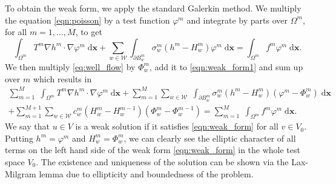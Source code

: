 \documentclass{elsarticle}
\def\vc#1{\mathbf{\boldsymbol{#1}}}     %
\def\avg#1{\langle#1\rangle}
\newcommand{\dd}{\; \mathrm{d}}
\newcommand{\bx}{\vc{x}}
\newcommand{\noteJB}[1]{{\color{Blue} \textbf{JB: } \textit{#1}}}
\begin{document}
To obtain the weak form, we apply the standard Galerkin method. We multiply the equation \eqref{eqn:poisson} 
by a test function $\varphi^m$ and integrate by parts over $\Omega^m$, for all $m=1,\ldots,M$, to get
\begin{equation} \label{eqn:weak_form1}
  \int_{\Omega^m} T^m \nabla h^m \cdot \nabla \varphi^m \dd\bx
  + \sum_{w\in \mathcal{W}} \int_{\partial B^m_w} \sigma^m_w (h^m - H_w^m) \varphi^m \dd\bx
  = \int_{\Omega^m} f^m\varphi^m \dd\bx.
\end{equation}
We then multiply \eqref{eq:well_flow} by $\Phi^m_w$, add it to \eqref{eqn:weak_form1} 
and sum up over $m$ which results in
\begin{multline} \label{eqn:weak_form}
  \sum_{m=1}^M \; \int_{\Omega^m} T^m \nabla h^m \cdot \nabla \varphi^m \dd\bx
        + \sum_{m=1}^M \sum_{w\in \mathcal{W}} \; 
           \int_{\partial B^m_w} \sigma^m_w\left(h^m-H^m_w\right)\left(\varphi^m-\Phi^m_w\right) \dd\bx \\
        + \sum_{m=1}^{M+1} \sum_{w\in\mathcal{W}}
          c_w^{m}\left( H^{m}_w-H_w^{m-1}\right)\left(\Phi^{m}_w - \Phi^{m-1}_w\right)           
  = \sum_{m=1}^M \; \int_{\Omega^m} f^m\varphi^m \dd\bx.   
\end{multline}
We say that $u\in V$ is a weak solution if it satisfies \eqref{eqn:weak_form} for all $v\in V_0$. 
Putting $h^m=\varphi^m$ and $H^m_w=\Phi^m_w$, we can clearly see the elliptic character of all terms on the 
left hand side of the weak form \eqref{eqn:weak_form} in the whole test space $V_0$. The existence and uniqueness of the solution can be shown 
via the Lax-Milgram lemma due to ellipticity and boundedness of the problem.
\end{document}
